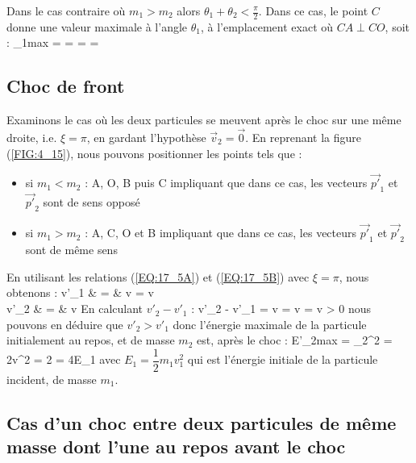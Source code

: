 Dans le cas contraire o\`u $m_{1} > m_{2}$ alors $\theta_{1} + \theta_{2} < \frac{\pi}{2}$. Dans ce cas, le point $C$ donne une valeur maximale \`a l'angle $\theta_{1}$, \`a l'emplacement exact o\`u $CA \perp CO$, soit :
\be
	\sin\theta_{1max} =  =  =  =  \label{EQ:17_8}
\ee

\subsection{Choc de front}

Examinons le cas o\`u les deux particules se meuvent apr\`es le choc sur une m\^eme droite, i.e. $\xi = \pi$, en gardant l'hypoth\`ese $\vec{v}_{2} = \vec{0}$. En reprenant la figure (\ref{FIG:4_15}), nous pouvons positionner les points tels que :
\begin{itemize}
	\item si $m_{1} < m_{2}$ : A, O, B puis C impliquant que dans ce cas, les vecteurs $\vec{p'}_{1}$ et $\vec{p'}_{2}$ sont de sens oppos\'e
	\item si $m_{1} > m_{2}$ : A, C, O et B impliquant que dans ce cas, les vecteurs $\vec{p'}_{1}$ et $\vec{p'}_{2}$ sont de m\^eme sens
\end{itemize}
En utilisant les relations (\ref{EQ:17_5A}) et (\ref{EQ:17_5B}) avec $\xi = \pi$, nous obtenons :
\bea
	v'_{1} & = & v = v \nonumber \\
	v'_{2} & = & v \label{EQ:17_6}
\eea
En calculant $v'_{2} - v'_{1}$ :
\be
	v'_{2} - v'_{1} = v = v = v > 0
\ee
nous pouvons en d\'eduire que $v'_{2} > v'_{1}$ donc l'\'energie maximale de la particule initialement au repos, et de masse $m_{2}$ est, apr\`es le choc :
\be
	E'_{2max} = _{2}^{2} = 2v^{2} = 2 = 4E_{1} \label{EQ:17_7}
\ee
avec $E_{1} = \dfrac{1}{2}m_{1}v_{1}^{2}$ qui est l'\'energie initiale de la particule incident, de masse $m_{1}$.

\subsection{Cas d'un choc entre deux particules de même masse dont l'une au repos avant le choc}

